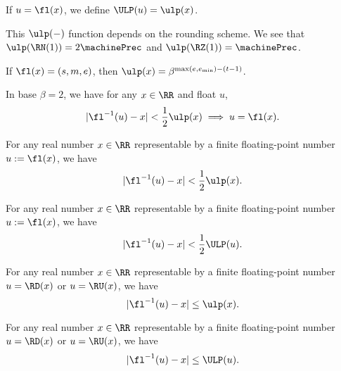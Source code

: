 \begin{defn}
  If $u=\fl(x)$, we define $\ULP(u)=\ulp(x)$.
\end{defn}

\begin{ex}
  This $\ulp(-)$ function depends on the rounding scheme.
  We see that $\ulp(\RN(1)) = 2\machinePrec$ and $\ulp(\RZ(1))=\machinePrec$.
\end{ex}


\begin{thm}
  If $\fl(x)=(s,m,e)$, then $\ulp(x) = \beta^{\max(e,e_{\text{min}})-(t-1)}$.
\end{thm}


\begin{thm}
  In base $\beta=2$, we have for any $x\in\RR$ and float $u$,
  \begin{equation*}
    |\fl^{-1}(u)-x| < \frac{1}{2}\ulp(x)\implies u = \fl(x).
  \end{equation*}
\end{thm}


\begin{thm}
  For any real number $x\in\RR$ representable by a finite floating-point
  number $u:=\fl(x)$, we have
  \begin{equation*}
    |\fl^{-1}(u)-x| < \frac{1}{2}\ulp(x).
  \end{equation*}
\end{thm}


\begin{thm}
  For any real number $x\in\RR$ representable by a finite floating-point
  number $u:=\fl(x)$, we have
  \begin{equation*}
    |\fl^{-1}(u)-x| < \frac{1}{2}\ULP(u).
  \end{equation*}
\end{thm}


\begin{thm}
  For any real number $x\in\RR$ representable by a finite floating-point
  number $u=\RD(x)$ or $u=\RU(x)$, we have
  \begin{equation*}
    |\fl^{-1}(u)-x|\leq\ulp(x).
  \end{equation*}
\end{thm}


\begin{thm}
  For any real number $x\in\RR$ representable by a finite floating-point
  number $u=\RD(x)$ or $u=\RU(x)$, we have
  \begin{equation*}
    |\fl^{-1}(u)-x|\leq\ULP(u).
  \end{equation*}
\end{thm}
